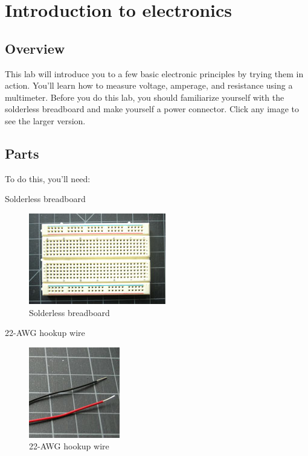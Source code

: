 \chapter{Introduction to electronics}

\section{Overview}

This lab will introduce you to a few basic electronic principles by trying them in action. You'll learn how to measure voltage, amperage, and resistance using a multimeter. Before you do this lab, you should familiarize yourself with the solderless breadboard and make yourself a power connector.
Click any image to see the larger version.


\section{Parts}

To do this, you'll need:

Solderless breadboard

\begin{figure}[!htb]
 \centering
 \includegraphics[scale=1.0]{img/electronics/breadboard.jpg}
 \caption{Solderless breadboard}
 \label{Solderless breadboard}
\end{figure}

22-AWG hookup wire

\begin{figure}[!htb]
 \centering
 \includegraphics[scale=0.8]{img/electronics/hookup_wire.jpg}
 \caption{22-AWG hookup wire}
 \label{22-AWG hookup wire}
\end{figure}

